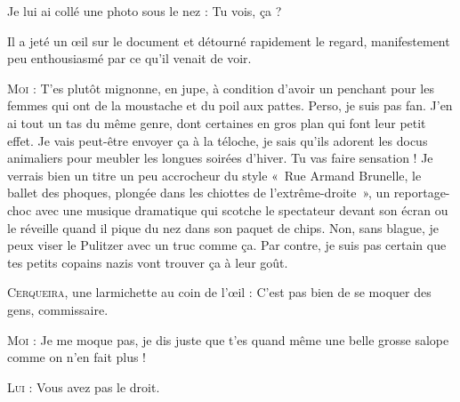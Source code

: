 \begin{dialogue}
Je lui ai collé une photo sous le nez : Tu vois, ça ?

Il a jeté un œil sur le document et détourné rapidement le regard, manifestement peu enthousiasmé par ce qu’il venait de voir.

\textsc{Moi} : T’es plutôt mignonne, en jupe, à condition d’avoir un penchant pour les femmes qui ont de la moustache et du poil aux pattes. Perso, je suis pas fan. J’en ai tout un tas du même genre, dont certaines en gros plan qui font leur petit effet. Je vais peut-être envoyer ça à la téloche, je sais qu’ils adorent les docus animaliers pour meubler les longues soirées d’hiver. Tu vas faire sensation ! Je verrais bien un titre un peu accrocheur du style «~Rue Armand Brunelle, le ballet des phoques, plongée dans les chiottes de l’extrême-droite~», un reportage-choc avec une musique dramatique qui scotche le spectateur devant son écran ou le réveille quand il pique du nez dans son paquet de chips. Non, sans blague, je peux viser le Pulitzer avec un truc comme ça. Par contre, je suis pas certain que tes petits copains nazis vont trouver ça à leur goût.

\textsc{Cerqueira}, une larmichette au coin de l’œil : C’est pas bien de se moquer des gens, commissaire.

\textsc{Moi} : Je me moque pas, je dis juste que t’es quand même une belle grosse salope comme on n’en fait plus !

%
%
%
\textsc{Lui} : Vous avez pas le droit.


\end{dialogue}

